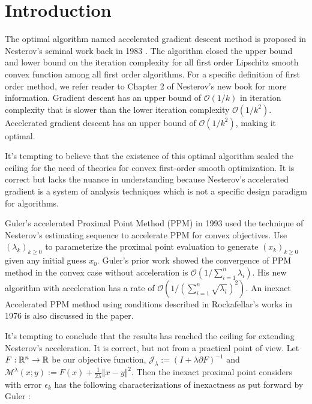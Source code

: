 \documentclass[12pt]{article}
\begin{document}
\section{Introduction}
    \par
    The optimal algorithm named accelerated gradient descent method is proposed in Nesterov's seminal work back in 1983 \cite{nesterov_method_1983}. 
    The algorithm closed the upper bound and lower bound on the iteration complexity for all first order Lipschitz smooth convex function among all first order algorithms. 
    For a specific definition of first order method, we refer reader to Chapter 2 of Nesterov's new book \cite{nesterov_lectures_2018} for more information. 
    Gradient descent has an upper bound of $\mathcal O(1/k)$ in iteration complexity that is slower than
    the lower iteration complexity $\mathcal O(1/k^2)$. 
    Accelerated gradient descent has an upper bound of $\mathcal O(1/k^2)$, making it optimal. 
    \par
    It's tempting to believe that the existence of this optimal algorithm sealed the ceiling for the need of theories for convex first-order smooth optimization. 
    It is correct but lacks the nuance in understanding because Nesterov's accelerated gradient is a system of analysis techniques which is not a specific design paradigm for algorithms. 
    \par
    Guler's accelerated Proximal Point Method (PPM) \cite{guler_new_1992} in 1993 used the technique of Nesterov's estimating sequence to accelerate PPM for convex objectives. 
    Use $(\lambda_k)_{k \ge 0}$ to parameterize the proximal point evaluation to generate $(x_k)_{k\ge 0}$ given any initial guess $x_0$.
    Guler's prior work \cite{guler_convergence_1991} showed the convergence of PPM method in the convex case without acceleration is $\mathcal O\left(1/\sum^{n}_{i = 1}\lambda_i\right)$. 
    His new algorithm with acceleration has a rate of $\mathcal O\left(1/(\sum_{i = 1}^{n} \sqrt{\lambda_i})^2\right)$. 
    An inexact Accelerated PPM method using conditions described in Rockafellar's works in 1976 \cite{rockafellar_monotone_1976} is also discussed in the paper. 
    \par
    It's tempting to conclude that the results has reached the ceiling for extending Nesterov's acceleration. 
    It is correct, but not from a practical point of view. 
    Let $F: \mathbb R^n \rightarrow\mathbb R$ be our objective function, $\mathcal J_\lambda := (I + \lambda \partial F)^{-1}$ and $\mathcal M^{\lambda}(x; y):= F(x) + \frac{1}{2\lambda}\Vert x - y\Vert^2$. Then the inexact proximal point considers with error $\epsilon_k$ has the following characterizations of inexactness as put forward by Guler \cite{guler_new_1992}: 
\end{document}
